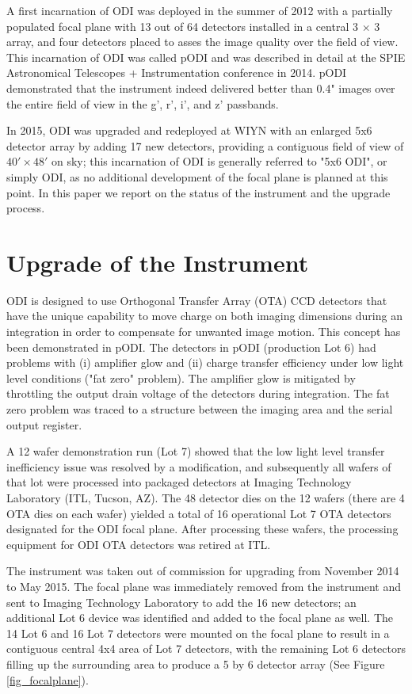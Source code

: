 \documentclass[]{spieman}
\begin{document}
A first incarnation of ODI was deployed in the summer of 2012 with a partially
populated focal plane with 13 out of 64 detectors installed in a central 3 $\times$
 3 array, and four detectors placed to asses the image quality over the field of view.
This incarnation of ODI was called pODI and was described in detail at the SPIE Astronomical
Telescopes + Instrumentation conference in 2014\cite{harbeck2014}. pODI
demonstrated that the instrument indeed delivered better than 0.4" images over
the entire field of view in the g', r', i', and z' passbands.

In 2015, ODI was upgraded and redeployed at WIYN  with an enlarged 5x6  detector
array by adding 17 new detectors, providing a contiguous field of view of $40' \times 48'$
on sky; this incarnation  of ODI is generally  referred to "5x6 ODI", or simply
ODI, as no additional development of the focal plane is planned at this point.
In this paper we report on the status of the instrument and the upgrade process.


\section{Upgrade of the Instrument} 

ODI is designed to use Orthogonal Transfer Array (OTA) CCD detectors that have
the unique capability to move charge on both imaging dimensions during an
integration in order to compensate for unwanted image motion. This concept has
been demonstrated in pODI.  The detectors in pODI (production Lot 6) had
problems with (i) amplifier glow and (ii)  charge transfer efficiency under low
light level conditions ("fat zero" problem). The amplifier glow is mitigated by
throttling the output drain voltage of the detectors during integration. The fat
zero problem was traced to a structure between the imaging area and the serial
output register.

A  12 wafer demonstration run (Lot 7)  showed that the low light level transfer
inefficiency issue was resolved by a modification\cite{harbeck2014}, and subsequently
all
wafers of that lot were processed into packaged detectors at Imaging
Technology Laboratory (ITL, Tucson, AZ). The  48 detector dies on the 12 wafers 
(there are 4 OTA dies on each wafer) yielded a total of 16 operational Lot 7 
OTA detectors designated for the ODI focal plane. After processing
these wafers, the processing equipment for ODI OTA detectors was retired at
ITL.

The instrument was taken out of commission for upgrading from November 2014 to
May 2015. The focal plane was immediately removed from the instrument and sent
to  Imaging Technology Laboratory to add the 16 new
detectors; an additional Lot 6 device was identified and added to the focal
plane as well. The 14 Lot 6 and 16 Lot 7 detectors were mounted on the focal
plane to result in a contiguous central 4x4 area of Lot 7 detectors, with the remaining
Lot 6 detectors filling up the surrounding area to produce a 5 by 6 detector array 
(See Figure \ref{fig_focalplane}).
\end{document}
